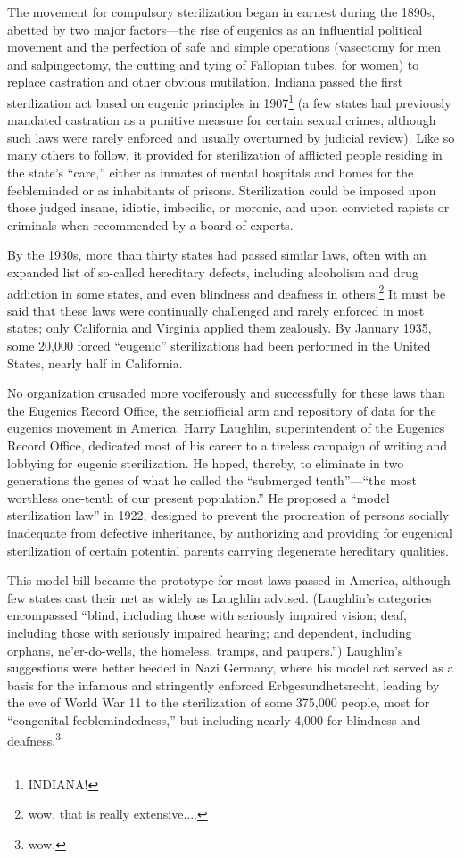 \documentclass[12pt]{letter}
\begin{document}
The movement for compulsory sterilization began in earnest during the 1890s, abetted by
two major factors—the rise of eugenics as an influential political movement and the
perfection of safe and simple operations (vasectomy for men and salpingectomy, the
cutting and tying of Fallopian tubes, for women) to replace castration and other obvious
mutilation. Indiana passed the first sterilization act based on eugenic principles in 1907\footnote{INDIANA!} (a
few states had previously mandated castration as a punitive measure for certain sexual
crimes, although such laws were rarely enforced and usually overturned by judicial
review). Like so many others to follow, it provided for sterilization of afflicted people
residing in the state’s “care,” either as inmates of mental hospitals and homes for the
feebleminded or as inhabitants of prisons. Sterilization could be imposed upon those
judged insane, idiotic, imbecilic, or moronic, and upon convicted rapists or criminals
when recommended by a board of experts.

By the 1930s, more than thirty states had passed similar laws, often with an expanded list
of so-called hereditary defects, including alcoholism and drug addiction in some states,
and even blindness and deafness in others.\footnote{wow. that is really extensive....} It must be said that these laws were continually challenged and rarely enforced in most states; only California and Virginia
applied them zealously. By January 1935, some 20,000 forced “eugenic” sterilizations
had been performed in the United States, nearly half in California.

No organization crusaded more vociferously and successfully for these laws than the
Eugenics Record Office, the semiofficial arm and repository of data for the eugenics
movement in America. Harry Laughlin, superintendent of the Eugenics Record Office,
dedicated most of his career to a tireless campaign of writing and lobbying for eugenic
sterilization. He hoped, thereby, to eliminate in two generations the genes of what he
called the “submerged tenth”—“the most worthless one-tenth of our present population.”
He proposed a “model sterilization law” in 1922, designed to prevent the procreation of persons socially inadequate from defective inheritance, by authorizing and providing for eugenical sterilization of certain
potential parents carrying degenerate hereditary qualities.

This model bill became the prototype for most laws passed in America, although few
states cast their net as widely as Laughlin advised. (Laughlin’s categories encompassed
“blind, including those with seriously impaired vision; deaf, including those with
seriously impaired hearing; and dependent, including orphans, ne’er-do-wells, the
homeless, tramps, and paupers.”) Laughlin’s suggestions were better heeded in Nazi
Germany, where his model act served as a basis for the infamous and stringently enforced
Erbgesundhetsrecht, leading by the eve of World War 11 to the sterilization of some
375,000 people, most for “congenital feeblemindedness,” but including nearly 4,000 for
blindness and deafness.\footnote{wow.}
\end{document}
